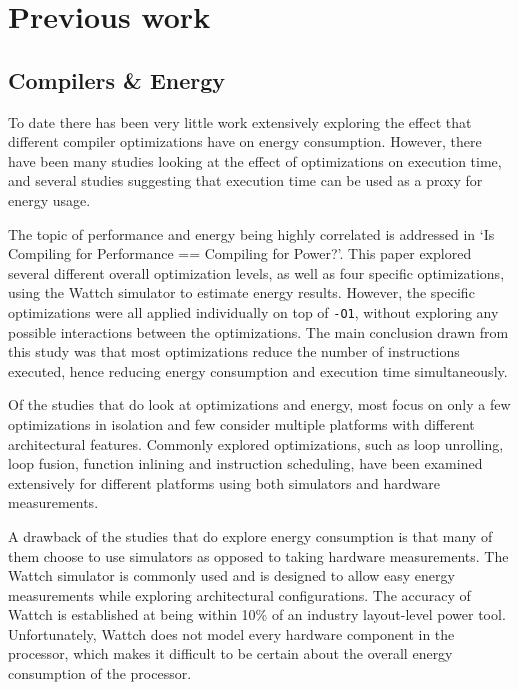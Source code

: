 \documentclass[twocolumn]{article}
\begin{document}
\section{Previous work}

\subsection{Compilers \& Energy}

To date there has been very little work extensively exploring the effect that different compiler optimizations have on energy consumption. However, there have been many studies looking at the effect of optimizations on execution time\cite{Haneda2005}, and several studies suggesting that execution time can be used as a proxy for energy usage\cite{CompilingForPerformancePower}.

The topic of performance and energy being highly correlated is addressed in `Is Compiling for Performance == Compiling for Power?'\cite{CompilingForPerformancePower}. This paper explored several different overall optimization levels, as well as four specific optimizations, using the Wattch simulator to estimate energy results. However, the specific optimizations were all applied individually on top of \texttt{-O1}, without exploring any possible interactions between the optimizations. The main conclusion drawn from this study was that most optimizations reduce the number of instructions executed, hence reducing energy consumption and execution time simultaneously.

Of the studies that do look at optimizations and energy, most focus on only a few optimizations in isolation and few consider multiple platforms with different architectural features. Commonly explored optimizations, such as loop unrolling\cite{Ayala2004}, loop fusion\cite{Zhu2004}, function inlining\cite{Kim2012} and instruction scheduling\cite{Toburen1998}, have been examined extensively for different platforms using both simulators and hardware measurements\cite{EffectOfCompilerOptimizationsOnPentium4}.

A drawback of the studies that do explore energy consumption is that many of them choose to use simulators as opposed to taking hardware measurements. The Wattch simulator\cite{Wattch} is commonly used and is designed to allow easy energy measurements while exploring architectural configurations. The accuracy of Wattch is established at being within 10\% of an industry layout-level power tool. Unfortunately, Wattch does not model every hardware component in the processor, which makes it difficult to be certain about the overall energy consumption of the processor.
\end{document}
